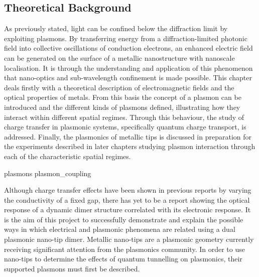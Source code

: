 \documentclass[12pt, a4paper, oneside]{book}
\begin{document}
\begin{singlespace}
{\color{white}
\chapter{Theoretical Background}}
\label{ch:theory}
\end{singlespace}


As previously stated, light can be confined below the diffraction limit by exploiting plasmons. By transferring energy from a diffraction-limited photonic field into collective oscillations of conduction electrons, an enhanced electric field can be generated on the surface of a metallic nanostructure with nanoscale localisation. It is through the understanding and application of this phenomenon that nano-optics and sub-wavelength confinement is made possible.
This chapter deals firstly with a theoretical description of electromagnetic fields and the optical properties of metals. From this basis the concept of a plasmon can be introduced and the different kinds of plasmons defined, illustrating how they interact within different spatial regimes. Through this behaviour, the study of charge transfer in plasmonic systems, specifically quantum charge transport, is addressed. Finally, the plasmonics of metallic tips is discussed in preparation for the experiments described in later chapters studying plasmon interaction through each of the characteristic spatial regimes.

{plasmons}
{plasmon_coupling}

Although charge transfer effects have been shown in previous reports by varying the conductivity of a fixed gap, there has yet to be a report showing the optical response of a dynamic dimer structure correlated with its electronic response. It is the aim of this project to successfully demonstrate and explain the possible ways in which electrical and plasmonic phenomena are related using a dual plasmonic nano-tip dimer. Metallic nano-tips are a plasmonic geometry currently receiving significant attention from the plasmonics community. In order to use nano-tips to determine the effects of quantum tunnelling on plasmonics, their supported plasmons must first be described.
\end{document}

